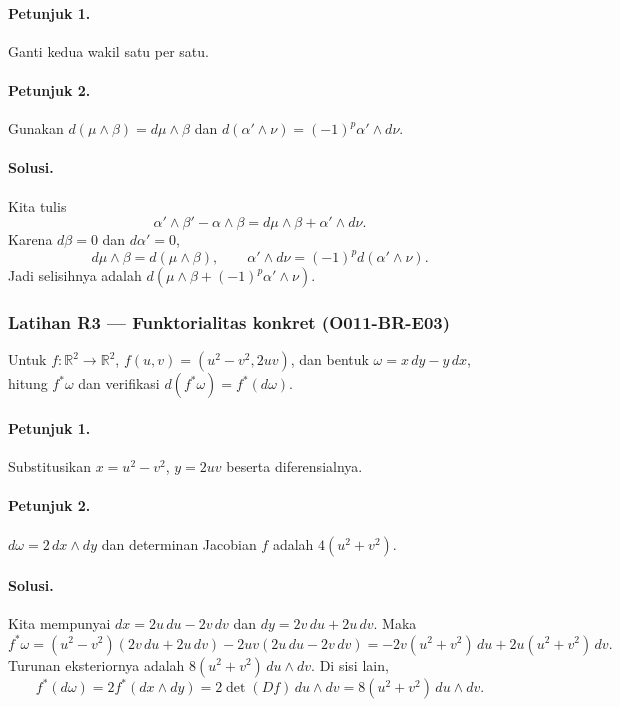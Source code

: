 \paragraph{Petunjuk 1.}
Ganti kedua wakil satu per satu.

\paragraph{Petunjuk 2.}
Gunakan $d(\mu\wedge\beta)=d\mu\wedge\beta$ dan
$d(\alpha'\wedge\nu)=(-1)^p\alpha'\wedge d\nu$.

\paragraph{Solusi.}
Kita tulis
\[
 \alpha'\wedge\beta'-\alpha\wedge\beta
 =d\mu\wedge\beta+\alpha'\wedge d\nu.
\]
Karena $d\beta=0$ dan $d\alpha'=0$,
\[
 d\mu\wedge\beta=d(\mu\wedge\beta),
 \qquad
 \alpha'\wedge d\nu=(-1)^p d(\alpha'\wedge\nu).
\]
Jadi selisihnya adalah
$d(\mu\wedge\beta+(-1)^p\alpha'\wedge\nu)$.

\subsubsection*{Latihan R3 — Funktorialitas konkret (O011-BR-E03)}
\label{o011-br-e03}

Untuk $f\colon\mathbb R^2\to\mathbb R^2$,
$f(u,v)=(u^2-v^2,2uv)$, dan bentuk $\omega=x\,dy-y\,dx$, hitung
$f^*\omega$ dan verifikasi $d(f^*\omega)=f^*(d\omega)$.

\paragraph{Petunjuk 1.}
Substitusikan $x=u^2-v^2$, $y=2uv$ beserta diferensialnya.

\paragraph{Petunjuk 2.}
$d\omega=2\,dx\wedge dy$ dan determinan Jacobian $f$ adalah
$4(u^2+v^2)$.

\paragraph{Solusi.}
Kita mempunyai
$dx=2u\,du-2v\,dv$ dan $dy=2v\,du+2u\,dv$. Maka
\[
 f^*\omega
 =(u^2-v^2)(2v\,du+2u\,dv)
 -2uv(2u\,du-2v\,dv)
 =-2v(u^2+v^2)\,du+2u(u^2+v^2)\,dv.
\]
Turunan eksteriornya adalah
$8(u^2+v^2)\,du\wedge dv$. Di sisi lain,
\[
 f^*(d\omega)=2f^*(dx\wedge dy)
 =2\det(Df)\,du\wedge dv
 =8(u^2+v^2)\,du\wedge dv.
\]

